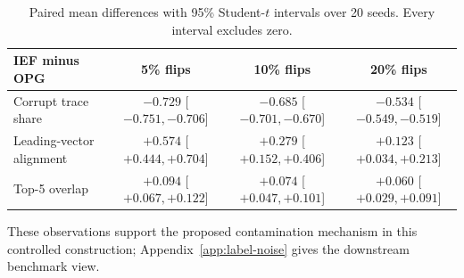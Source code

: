 \begin{table}[H]
\caption{Direct full-matrix contamination diagnostic. Alignment is the absolute inner product of the leading eigenvectors; top-5 overlap is the mean squared singular value between the corresponding eigenspaces. Each reference is the clean contribution from the same fitted model.}
\label{tab:contamination-mechanism}
\centering
\small
{}
\end{table}

\begin{table}[H]
\caption{Paired mean differences with 95\% Student-$t$ intervals over 20 seeds. Every interval excludes zero.}
\label{tab:contamination-mechanism-intervals}
\centering
\small
\begin{tabular}{lccc}
\toprule
IEF minus OPG & 5\% flips & 10\% flips & 20\% flips \\
\midrule
Corrupt trace share & $-0.729$ [$-0.751,-0.706$] & $-0.685$ [$-0.701,-0.670$] & $-0.534$ [$-0.549,-0.519$] \\
Leading-vector alignment & $+0.574$ [$+0.444,+0.704$] & $+0.279$ [$+0.152,+0.406$] & $+0.123$ [$+0.034,+0.213$] \\
Top-5 overlap & $+0.094$ [$+0.067,+0.122$] & $+0.074$ [$+0.047,+0.101$] & $+0.060$ [$+0.029,+0.091$] \\
\bottomrule
\end{tabular}
\end{table}

These observations support the proposed contamination mechanism in this controlled construction; Appendix~\ref{app:label-noise} gives the downstream benchmark view.

